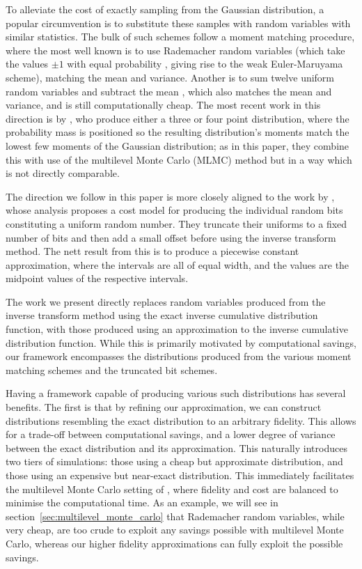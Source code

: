 \documentclass[manuscript,review]{acmart}
\begin{document}
To alleviate the cost of exactly sampling from the Gaussian distribution, a popular circumvention is to substitute these samples with random variables with similar statistics. The bulk of such schemes follow a moment matching procedure, where the most well known is to use Rademacher random variables (which take the values $ \pm 1 $ with equal probability \citep[page~XXXII]{kloeden1999numerical}, giving rise to the weak Euler-Maruyama scheme), matching the mean and variance. Another is to sum twelve uniform random variables and subtract the mean \citep[page~500]{munk2011fixed}, which also matches the mean and variance, and is still computationally cheap. The most recent work in this direction is by \citet{muller2015improving}, who produce either a three or four point distribution, where the probability mass is positioned so the resulting distribution's moments match the lowest few moments of the Gaussian distribution; as in this paper, they combine this with use of the multilevel Monte Carlo (MLMC) method but in a way which is not directly comparable.

The direction we follow in this paper is more closely aligned to the work by \citet{giles2019random_quadrature,giles2019random_multilevel}, whose analysis proposes a cost model for producing the individual random bits constituting a uniform random number. They truncate their uniforms to a fixed number of bits and then add a small offset before using the inverse transform method. The nett result from this is to produce a piecewise constant approximation, where the intervals are all of equal width, and the values are the midpoint values of the respective intervals. 

The work we present directly replaces random variables produced from the inverse transform method using the exact inverse cumulative distribution function, with those produced using an approximation to the inverse cumulative distribution function. While this is primarily motivated by computational savings, our framework encompasses the distributions produced from the various moment matching schemes and the truncated bit schemes. 

Having a framework capable of producing various such distributions has several benefits. The first is that by refining our approximation, we can construct distributions resembling the exact distribution to an arbitrary fidelity. This allows for a trade-off between computational savings, and a lower degree of variance between the exact distribution and its approximation. This naturally  introduces two tiers of simulations: those using a cheap but approximate distribution, and those using an expensive but near-exact distribution. This immediately facilitates the multilevel Monte Carlo setting of \citet{giles2008multilevel}, where fidelity and cost are balanced to minimise the computational time. As an example, we will see in section~\ref{sec:multilevel_monte_carlo} that Rademacher random variables, while very cheap, are too crude to exploit any savings possible with multilevel Monte Carlo, whereas our higher fidelity approximations can fully exploit the possible savings. 
\end{document}

